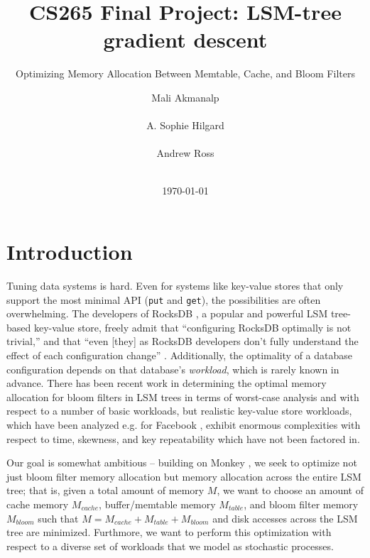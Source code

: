 \documentclass{sig-alternate-05-2015}
\begin{document}
\title{CS265 Final Project: LSM-tree gradient descent}
\subtitle{Optimizing Memory Allocation Between Memtable, Cache, and Bloom Filters}
\author{
\alignauthor
Mali Akmanalp\\
       \\
\alignauthor
A. Sophie Hilgard\\
       \\
\alignauthor Andrew Ross\\
       \\
       }

\date{\today}

\maketitle

\section{Introduction}

Tuning data systems is hard. Even for systems like key-value stores that only
support the most minimal API (\texttt{put} and \texttt{get}), the possibilities
are often overwhelming. The developers of RocksDB \cite{facebook:rocksdb}, a
popular and powerful LSM tree-based key-value store, freely admit that
``configuring RocksDB optimally is not trivial,'' and that ``even [they] as
RocksDB developers don't fully understand the effect of each configuration
change'' \cite{rocksdb-tuning-guide}. Additionally, the optimality of a
database configuration depends on that database's \textit{workload}, which is
rarely known in advance.  There has been recent work \cite{monkey} in
determining the optimal memory allocation for bloom filters in LSM trees in
terms of worst-case analysis and with respect to a number of basic workloads,
but realistic key-value store workloads, which have been analyzed e.g. for
Facebook \cite{characterizing-memcached}, exhibit enormous complexities with
respect to time, skewness, and key repeatability which have not been factored
in.

Our goal is somewhat ambitious -- building on Monkey \cite{monkey}, we seek to
optimize not just bloom filter memory allocation but memory allocation across
the entire LSM tree; that is, given a total amount of memory $M$, we want to
choose an amount of cache memory $M_{cache}$, buffer/memtable memory
$M_{table}$, and bloom filter memory $M_{bloom}$ such that
$M=M_{cache}+M_{table}+M_{bloom}$ and disk accesses across the LSM tree are
minimized. Furthmore, we want to perform this optimization with respect to a
diverse set of workloads that we model as stochastic processes.
\end{document}
